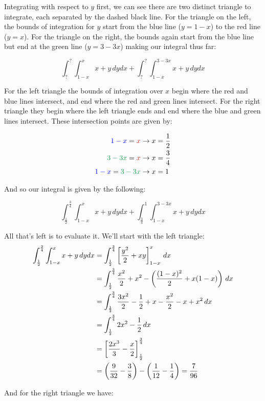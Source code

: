 \documentclass{article}
\begin{document}
Integrating with respect to $y$ first, we can see there are two distinct triangle to integrate, each separated by the dashed black line. For the triangle on the left, the bounds of integration for $y$ start from the blue line ($y=1-x$) to the red line ($y=x$). For the triangle on the right, the bounds again start from the blue line but end at the green line ($y=3-3x$) making our integral thus far:

$$\int^?_?\int^{x}_{1-x}x+y\,dydx+\int^?_?\int^{3-3x}_{1-x}x+y\,dydx$$

For the left triangle the bounds of integration over $x$ begin where the red and blue lines intersect, and end where the red and green lines intersect. For the right triangle they begin where the left triangle ends and end where the blue and green lines intersect. These intersection points are given by:

\begin{align*}
    \textcolor{blue}{1-x}=\textcolor{BrickRed}{x}&\rightarrow x=\frac{1}{2}\\
    \textcolor{ForestGreen}{3-3x}=\textcolor{BrickRed}{x}&\rightarrow x=\frac{3}{4}\\
    \textcolor{blue}{1-x}=\textcolor{ForestGreen}{3-3x}&\rightarrow x=1
\end{align*}

And so our integral is given by the following:

$$\int^{\frac{3}{4}}_\frac{1}{2}\int^{x}_{1-x}x+y\,dydx+\int^{1}_{\frac{3}{4}}\int^{3-3x}_{1-x}x+y\,dydx$$
\bigskip

All that's left is to evaluate it. We'll start with the left triangle:
\begin{align*}
    \int^\frac{3}{4}_\frac{1}{2}\int^{x}_{1-x}x+y\,dydx&=\int^\frac{3}{4}_\frac{1}{2}\left[\frac{y^2}{2}+xy\right]_{1-x}^{x}\,dx\\
    &=\int^\frac{3}{4}_\frac{1}{2}\frac{x^2}{2}+x^2-\left(\frac{(1-x)^2}{2}+x(1-x)\right)\,dx\\
    &=\int^\frac{3}{4}_\frac{1}{2}\frac{3x^2}{2}-\frac{1}{2}+x-\frac{x^2}{2}-x+x^2\,dx\\
    &=\int^\frac{3}{4}_\frac{1}{2}2x^2-\frac{1}{2}\,dx\\
    &=\left[\frac{2x^3}{3}-\frac{x}{2}\right]_{\frac{1}{2}}^{\frac{3}{4}}\\
    &=\left(\frac{9}{32}-\frac{3}{8}\right)-\left(\frac{1}{12}-\frac{1}{4}\right)=\frac{7}{96}
\end{align*}

And for the right triangle we have:
\end{document}
